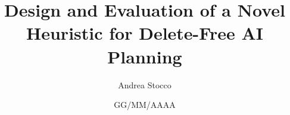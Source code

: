 \documentclass[12pt,a4paper,twoside,openright]{extreport}
\title{Design and Evaluation of a Novel Heuristic for Delete-Free AI Planning}
\author{Andrea Stocco}
\date{GG/MM/AAAA}
\theoremstyle{definition}
\begin{document}
\pagestyle{empty} %


\cleardoublepage


\cleardoublepage

\begin{abstract}
	
\end{abstract}
\cleardoublepage

\pagestyle{plain} %

\tableofcontents
\cleardoublepage

\listoffigures
\cleardoublepage %

\listoftables
\cleardoublepage

\listofalgorithms
\cleardoublepage



\cleardoublepage


\cleardoublepage


\cleardoublepage


\cleardoublepage


\cleardoublepage

\nocite{planning-tutorial}
\printbibliography[heading=bibintoc]
\end{document}
